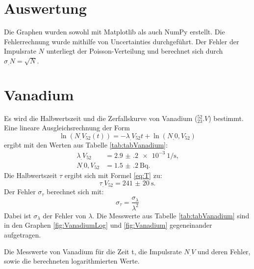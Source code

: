 \section{Auswertung}
\label{sec:Auswertung}

Die Graphen wurden sowohl mit Matplotlib \cite{matplotlib} als auch NumPy \cite{numpy} erstellt. Die
Fehlerrechnung wurde mithilfe von Uncertainties \cite{uncertainties} durchgeführt. Der Fehler der Impulsrate $N$ unterliegt der Poisson-Verteilung und berechnet sich durch $\sigma_.N=\sqrt{N}$. 

\section{Vanadium}

Es wird die Halbwertszeit und die Zerfallskurve von Vanadium ($^{52}_{23}.V$) bestimmt.
Eine lineare Ausgleichsrechnung der Form \[\ln(N_.{V_{52}}(t))=-\lambda_.{V_{52}} t+\ln(N_.{0,V_{52}})\] ergibt mit den Werten aus Tabelle \ref{tab:tabVanadium}:
\begin{align*}
\lambda_.{V_{52}}	&= \SI{2.9(2)e-3}{1\per\second}\text{,}\\
N_.{0,V_{52}} 		&= \SI{1.5(2)}{\becquerel}\text{.}
\end{align*}
Die Halbwertszeit $\tau$ ergibt sich mit Formel \eqref{eq:T} zu:
\begin{equation*}
\tau_.{V_{52}} = \SI{241(20)}{\second}\text{.}
\end{equation*}
Der Fehler $\sigma_{\tau}$ berechnet sich mit:
\begin{equation}
\sigma_{\tau} = \frac{\sigma_{\lambda}}{\lambda^2}\label{eq:sigma_tau}
\end{equation}
Dabei ist $\sigma_{\lambda}$ der Fehler von $\lambda$. Die Messwerte aus Tabelle \ref{tab:tabVanadium} sind in den Graphen \ref{fig:VanadiumLog} und \ref{fig:Vanadium} gegeneinander aufgetragen.

\begin{table}
	\centering
	\caption{Die Messwerte von Vanadium für die Zeit t, die Impulsrate $N_.V$ und deren Fehler, sowie die berechneten logarithmierten Werte.}
	
	\label{tab:tabVanadium}
\end{table}


